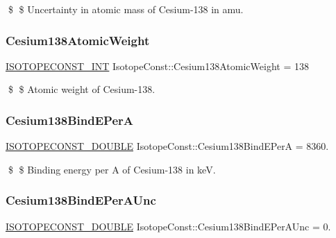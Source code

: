 \$ \$ Uncertainty in atomic mass of Cesium-\/138 in amu. \mbox{\label{group___isotope_const-_cesium-_cs138_gab677933781a9646db675d4adf8536e15}} 
\subsubsection{\texorpdfstring{Cesium138\+Atomic\+Weight}{Cesium138AtomicWeight}}
{\footnotesize\ttfamily \mbox{\hyperlink{group___isotope_const-_macros_ga5f18360b3e99483a35c32d789e62621c}{I\+S\+O\+T\+O\+P\+E\+C\+O\+N\+S\+T\+\_\+\+I\+NT}} Isotope\+Const\+::\+Cesium138\+Atomic\+Weight = 138}

\$ \$ Atomic weight of Cesium-\/138. \mbox{\label{group___isotope_const-_cesium-_cs138_gabe191d1014727599823f5a4b2177460a}} 
\subsubsection{\texorpdfstring{Cesium138\+Bind\+E\+PerA}{Cesium138BindEPerA}}
{\footnotesize\ttfamily \mbox{\hyperlink{group___isotope_const-_macros_ga8f45a7272ce02c0b4c65c44636ed719a}{I\+S\+O\+T\+O\+P\+E\+C\+O\+N\+S\+T\+\_\+\+D\+O\+U\+B\+LE}} Isotope\+Const\+::\+Cesium138\+Bind\+E\+PerA = 8360.}

\$ \$ Binding energy per A of Cesium-\/138 in keV. \mbox{\label{group___isotope_const-_cesium-_cs138_gab19a02519373eb027b923a31d9f2f77e}} 
\subsubsection{\texorpdfstring{Cesium138\+Bind\+E\+Per\+A\+Unc}{Cesium138BindEPerAUnc}}
{\footnotesize\ttfamily \mbox{\hyperlink{group___isotope_const-_macros_ga8f45a7272ce02c0b4c65c44636ed719a}{I\+S\+O\+T\+O\+P\+E\+C\+O\+N\+S\+T\+\_\+\+D\+O\+U\+B\+LE}} Isotope\+Const\+::\+Cesium138\+Bind\+E\+Per\+A\+Unc = 0.}

